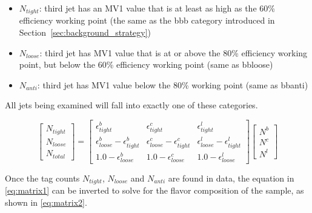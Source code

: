 	\begin{itemize}
		\item $N_{tight}$: third jet has an MV1 value that is at least as high as the 60\% efficiency working point (the same as the bbb category introduced in Section~\ref{sec:background_strategy})
		\item $N_{loose}$: third jet has MV1 value that is at or above the 80\% efficiency working point, but below the 60\% efficiency working point (same as bbloose)
		\item $N_{anti}$: third jet has MV1 value below the 80\% working point (same as bbanti)
	\end{itemize}

All jets being examined will fall into exactly one of these categories.

        \begin{equation}
            \begin{bmatrix} \scriptstyle
            N_{tight} \\ \scriptstyle
            N_{loose} \\ \scriptstyle
            N_{total}
            \end{bmatrix}    
            = 
            \begin{bmatrix} \scriptstyle
                \epsilon^b_{tight} & \scriptstyle \epsilon^c_{tight} & \scriptstyle \epsilon^l_{tight} \\  \scriptstyle
                \epsilon^b_{loose} - \epsilon^b_{tight} & \scriptstyle \epsilon^c_{loose} - \epsilon^c_{tight} & \scriptstyle \epsilon^l_{loose} - \epsilon^l_{tight} \\      \scriptstyle
                1.0 - \epsilon^b_{loose} & \scriptstyle 1.0 - \epsilon^c_{loose} & \scriptstyle  1.0 - \epsilon^l_{loose}
            \end{bmatrix}
            \begin{bmatrix} \scriptstyle
                N^b \\ \scriptstyle
                N^c \\ \scriptstyle
                N^l
            \end{bmatrix}
        \label{eq:matrix1} 
        \end{equation} %

Once the tag counts $N_{tight}$, $N_{loose}$ and $N_{anti}$ are found in data, the equation in \ref{eq:matrix1} can be inverted to solve for the flavor composition of the sample, as shown in \ref{eq:matrix2}.


